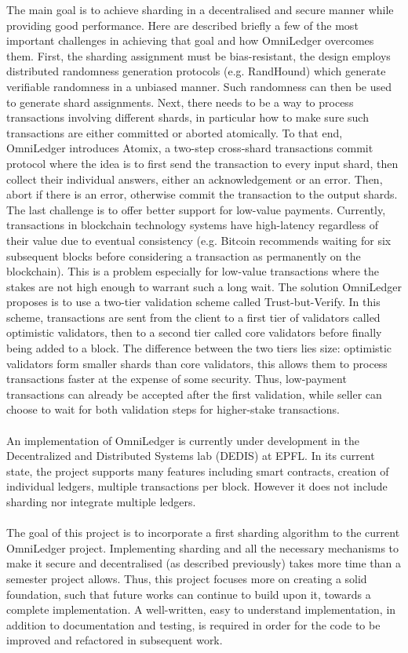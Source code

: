 The main goal is to achieve sharding in a decentralised and secure manner while providing good performance. Here are described briefly a few of the most important challenges in achieving that goal and how OmniLedger overcomes them. First, the sharding assignment must be bias-resistant, the design employs distributed randomness generation protocols (e.g. RandHound\cite{cryptoeprint:2016:1067}) which generate verifiable randomness in a unbiased manner. Such randomness can then be used to generate shard assignments. Next, there needs to be a way to process transactions involving different shards, in particular how to make sure such transactions are either committed or aborted atomically. To that end, OmniLedger introduces Atomix, a two-step cross-shard transactions commit protocol where the idea is to first send the transaction to every input shard, then collect their individual answers, either an acknowledgement or an error. Then, abort if there is an error, otherwise commit the transaction to the output shards. The last challenge is to offer better support for low-value payments. Currently, transactions in blockchain technology systems have high-latency regardless of their value due to eventual consistency (e.g. Bitcoin recommends waiting for six subsequent blocks before considering a transaction as permanently on the blockchain). This is a problem especially for low-value transactions where the stakes are not high enough to warrant such a long wait. The solution OmniLedger proposes is to use a two-tier validation scheme called Trust-but-Verify. In this scheme, transactions are sent from the client to a first tier of validators called optimistic validators, then to a second tier called core validators before finally being added to a block. The difference between the two tiers lies size: optimistic validators form smaller shards than core validators, this allows them to process transactions faster at the expense of some security. Thus, low-payment transactions can already be accepted after the first validation, while seller can choose to wait for both validation steps for higher-stake transactions. \\\\
An implementation of OmniLedger is currently under development in the Decentralized and Distributed Systems lab (DEDIS) at EPFL\cite{dedis}. In its current state, the project supports many features including smart contracts, creation of individual ledgers, multiple transactions per block. However it does not include sharding nor integrate multiple ledgers. \\\\
The goal of this project is to incorporate a first sharding algorithm to the current OmniLedger project. Implementing sharding and all the necessary mechanisms to make it secure and decentralised (as described previously) takes more time than a semester project allows. Thus, this project focuses more on creating a solid foundation, such that future works can continue to build upon it, towards a complete implementation. A well-written, easy to understand implementation, in addition to documentation and testing, is required in order for the code to be improved and refactored in subsequent work.
